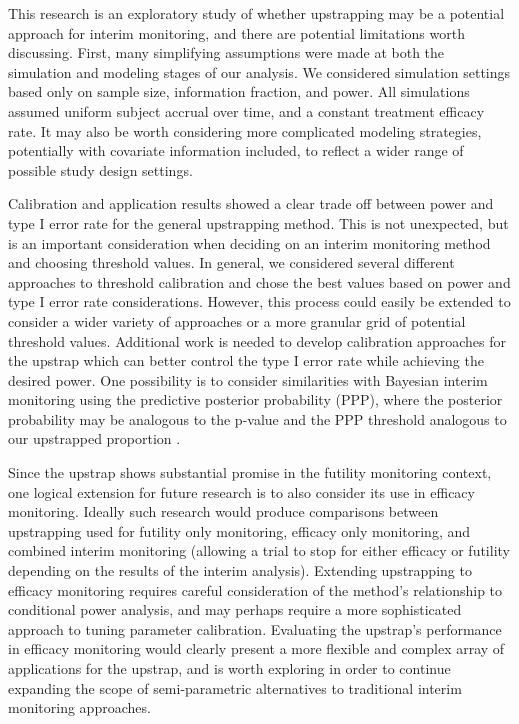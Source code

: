 \documentclass[Afour,sageh,times,square,numbers]{sagej}
\begin{document}
This research is an exploratory study of whether upstrapping may be a potential approach for interim monitoring, and there are potential limitations worth discussing.  First, many simplifying assumptions were made at both the simulation and modeling stages of our analysis.  We considered simulation settings based only on sample size, information fraction, and power.  All simulations assumed uniform subject accrual over time, and a constant treatment efficacy rate.  It may also be worth considering more complicated modeling strategies, potentially with covariate information included, to reflect a wider range of possible study design settings.

Calibration and application results showed a clear trade off between power and type I error rate for the general upstrapping method.  This is not unexpected, but is an important consideration when deciding on an interim monitoring method and choosing threshold values. In general, we considered several different approaches to threshold calibration and chose the best values based on power and type I error rate considerations.  However, this process could easily be extended to consider a wider variety of approaches or a more granular grid of potential threshold values.  Additional work is needed to develop calibration approaches for the upstrap which can better control the type I error rate while achieving the desired power. One possibility is to consider similarities with Bayesian interim monitoring using the predictive posterior probability (PPP), where the posterior probability may be analogous to the p-value and the PPP threshold analogous to our upstrapped proportion \cite{R10,R11,R12}.

Since the upstrap shows substantial promise in the futility monitoring context, one logical extension for future research is to also consider its use in efficacy monitoring.  Ideally such research would produce comparisons between upstrapping used for futility only monitoring, efficacy only monitoring, and combined interim  monitoring (allowing a trial to stop for either efficacy or futility depending on the results of the interim analysis).  Extending upstrapping to efficacy monitoring requires careful consideration of the method's relationship to conditional power analysis, and may perhaps require a more sophisticated approach to tuning parameter calibration.  Evaluating the upstrap's performance in efficacy monitoring would clearly present a more flexible and complex array of applications for the upstrap, and is worth exploring in order to continue expanding the scope of semi-parametric alternatives to traditional interim monitoring approaches.
\end{document}
